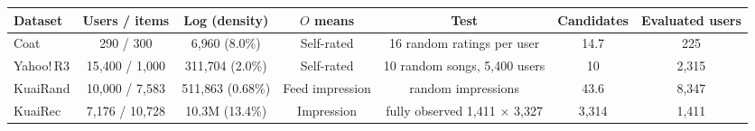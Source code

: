 \begin{tabular}{lcccccc}
\toprule
Dataset & Users / items & Log (density) & $O$ means & Test & Candidates & Evaluated users\\
\midrule
Coat & 290 / 300 & 6{,}960 (8.0\%) & Self-rated & 16 random ratings per user & 14.7 & 225\\
Yahoo!\,R3 & 15{,}400 / 1{,}000 & 311{,}704 (2.0\%) & Self-rated & 10 random songs, 5{,}400 users & 10 & 2{,}315\\
KuaiRand & 10{,}000 / 7{,}583 & 511{,}863 (0.68\%) & Feed impression & random impressions & 43.6 & 8{,}347\\
KuaiRec & 7{,}176 / 10{,}728 & 10.3M (13.4\%) & Impression & fully observed 1{,}411 $\times$ 3{,}327 & 3{,}314 & 1{,}411\\
\bottomrule
\end{tabular}
